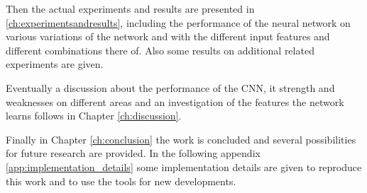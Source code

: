 Then the actual experiments and results are presented in \ref{ch:experimentsandresults}, including the performance of the neural network on various variations of the network and with the different input features and different combinations there of. Also some results on additional related experiments are given.

Eventually a discussion about the performance of the CNN, it strength and weaknesses on different areas and an investigation of the features the network learns follows in Chapter \ref{ch:discussion}. 

Finally in Chapter \ref{ch:conclusion} the work is concluded and several possibilities for future research are provided. In the following appendix \ref{app:implementation_details} some implementation details are given to reproduce this work and to use the tools for new developments.
